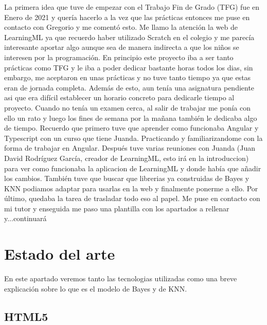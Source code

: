 \documentclass[a4paper, 12pt]{book}
\begin{document}
La primera idea que tuve de empezar con el Trabajo Fin de Grado (TFG) fue en Enero de 2021 y quería hacerlo a la vez que las prácticas entonces me puse en contacto con Gregorio y me comentó esto. Me llamo la atención la web de LearningML ya que recuerdo haber utilizado Scratch en el colegio y me parecía interesante aportar algo aunque sea de manera indirecta a que los niños se interesen por la programación.
En principio este proyecto iba a ser tanto prácticas como TFG y le iba a poder dedicar bastante horas todos los dias, sin embargo, me aceptaron en unas prácticas y no tuve tanto tiempo ya que estas eran de jornada completa. Además de esto, aun tenía una asignatura pendiente asi que era difícil establecer un horario concreto para dedicarle tiempo al proyecto. Cuando no tenía un examen cerca, al salir de trabajar me ponía con ello un rato y luego los fines de semana por la mañana también le dedicaba algo de tiempo. 
Recuerdo que primero tuve que aprender como funcionaba Angular y Typescript con un curso que tiene Juanda. Practicando y familiarizandome con la forma de trabajar en Angular.
Después tuve varias reuniones con Juanda (Juan David Rodríguez García, creador de LearningML, esto irá en la introduccion) para ver como funcionaba la aplicacion de LearningML y donde había que añadir los cambios.
También tuve que buscar que librerias ya construidas de Bayes y KNN podiamos adaptar para usarlas en la web y finalmente ponerme a ello.
Por último, quedaba la tarea de trasladar todo eso al papel. Me puse en contacto con mi tutor y enseguida me paso una plantilla con los apartados a rellenar y...continuará



\cleardoublepage
\chapter{Estado del arte}
\label{chap:estado}

En este apartado veremos tanto las tecnologias utilizadas como una breve explicación sobre lo que es el modelo de Bayes y de KNN.

\section{HTML5} 
\label{sec:html5}
\end{document}
